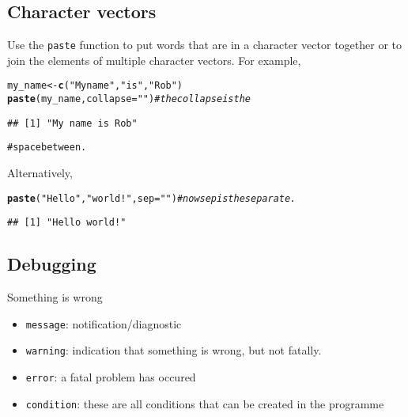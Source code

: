 \documentclass[12pt, a4paper, oneside]{article}\usepackage[]{graphicx}\usepackage[]{color}
\makeatletter
\newcommand{\hlstr}[1]{\textcolor[rgb]{0.192,0.494,0.8}{#1}}%
\newcommand{\hlcom}[1]{\textcolor[rgb]{0.678,0.584,0.686}{\textit{#1}}}%
\newcommand{\hlstd}[1]{\textcolor[rgb]{0.345,0.345,0.345}{#1}}%
\newcommand{\hlkwb}[1]{\textcolor[rgb]{0.69,0.353,0.396}{#1}}%
\newcommand{\hlkwc}[1]{\textcolor[rgb]{0.333,0.667,0.333}{#1}}%
\newcommand{\hlkwd}[1]{\textcolor[rgb]{0.737,0.353,0.396}{\textbf{#1}}}%
\newenvironment{kframe}{%
 \def\at@end@of@kframe{}%
 \ifinner\ifhmode%
  \def\at@end@of@kframe{\end{minipage}}%
  \begin{minipage}{\columnwidth}%
 \fi\fi%
 \def\FrameCommand##1{\hskip\@totalleftmargin \hskip-\fboxsep
 \colorbox{shadecolor}{##1}\hskip-\fboxsep
     \hskip-\linewidth \hskip-\@totalleftmargin \hskip\columnwidth}%
 \MakeFramed {\advance\hsize-\width
   \@totalleftmargin\z@ \linewidth\hsize
   \@setminipage}}%
 {\par\unskip\endMakeFramed%
 \at@end@of@kframe}
\newenvironment{knitrout}{}{} %
\makeatother
\begin{document}
\subsection{Character vectors}
Use the \lstinline{paste} function to put words that are in a character vector together or to join the elements of multiple character vectors.  For example, 

\begin{knitrout}
\color{fgcolor}\begin{kframe}
\begin{alltt}
\hlstd{my_name} \hlkwb{<-} \hlkwd{c}\hlstd{(}\hlstr{"My name"}\hlstd{,} \hlstr{"is"}\hlstd{,} \hlstr{"Rob"}\hlstd{)}
\hlkwd{paste}\hlstd{(my_name,} \hlkwc{collapse} \hlstd{=} \hlstr{" "}\hlstd{)}  \hlcom{# the collapse is the }
\end{alltt}
\begin{verbatim}
## [1] "My name is Rob"
\end{verbatim}
\begin{alltt}
# space between.
\end{alltt}
\end{kframe}
\end{knitrout}

Alternatively, 

\begin{knitrout}
\color{fgcolor}\begin{kframe}
\begin{alltt}
\hlkwd{paste}\hlstd{(}\hlstr{"Hello"}\hlstd{,} \hlstr{"world!"}\hlstd{,} \hlkwc{sep} \hlstd{=} \hlstr{" "}\hlstd{)}  \hlcom{# now sep is the separate.}
\end{alltt}
\begin{verbatim}
## [1] "Hello world!"
\end{verbatim}
\end{kframe}
\end{knitrout}


\subsection{Debugging}
Something is wrong
\begin{itemize}
\item \lstinline{message}: notification/diagnostic 
\item \lstinline{warning}: indication that something is wrong, but not fatally. 
\item \lstinline{error}: a fatal problem has occured
\item \lstinline{condition}: these are all conditions that can be created in the programme
\end{itemize}
\end{document}
